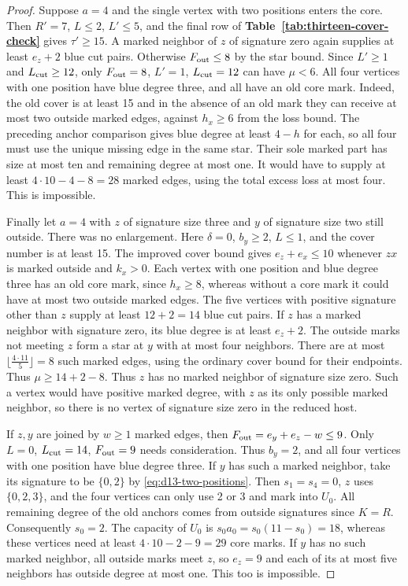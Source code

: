 \documentclass[preprint,11pt,numbers]{elsarticle-arxiv}
\numberwithin{equation}{section}
\theoremstyle{definition}
\begin{document}
\begin{proof}
Suppose $a=4$ and the single vertex with two positions enters the
core. Then $R'=7$, $L\le2$, $L'\le5$, and the final row of
\textbf{Table~\ref{tab:thirteen-cover-check}} gives $\tau'\ge15$. A marked neighbor of $z$ of signature
zero again supplies at least $e_z+2$ blue cut pairs. Otherwise
$F_{\rm out}\le8$ by the star bound. Since $L'\ge1$ and
$L_{\rm cut}\ge12$, only $F_{\rm out}=8$, $L'=1$, $L_{\rm cut}=12$
can have $\mu<6$. All four vertices with one position have blue
degree three, and all have an old core mark. Indeed, the old cover
is at least 15 and in the absence of an old mark they can receive
at most two outside marked edges, against $h_x\ge6$ from the loss bound.
The preceding anchor comparison gives blue degree at least $4-h$
for each, so all four must use the unique missing edge in the same
star. Their sole marked part has size at most ten and remaining degree
at most one. It would have to supply at least $4\cdot10-4-8=28$
marked edges, using the total excess loss at most four. This is
impossible.

Finally let $a=4$ with $z$ of signature size three and $y$ of
signature size two still outside. There was no enlargement. Here
$\delta=0$, $b_y\ge2$, $L\le1$, and the cover number is at least
15. The improved cover bound gives $e_z+e_x\le10$ whenever $zx$
is marked outside and $k_x>0$. Each vertex with one position and
blue degree three has an old core mark, since $h_x\ge8$, whereas
without a core mark it could have at most two outside marked edges.
The five vertices with positive signature other than $z$ supply
at least $12+2=14$ blue cut pairs. If $z$ has a marked neighbor with
signature zero, its blue degree is at least $e_z+2$. The outside
marks not meeting $z$ form a star at $y$ with at most four neighbors.
There are at most $\lfloor\frac{4\cdot11}{5}\rfloor=8$ such marked edges, using
the ordinary cover bound for their endpoints. Thus $\mu\ge14+2-8$.
Thus $z$ has no marked neighbor of signature size zero. Such
a vertex would have positive marked degree, with $z$ as its only
possible marked neighbor, so there is no vertex of signature size
zero in the reduced host.

If $z,y$ are joined by $w\ge1$ marked edges, then
$F_{\rm out}=e_y+e_z-w\le9$. Only $L=0$, $L_{\rm cut}=14$,
$F_{\rm out}=9$ needs consideration. Thus $b_y=2$, and all four
vertices with one position have blue degree three. If $y$ has such a
marked neighbor, take its signature to be $\{0,2\}$ by
\eqref{eq:d13-two-positions}. Then $s_1=s_4=0$, $z$ uses $\{0,2,3\}$,
and the four vertices can only use 2 or 3 and mark into $U_0$.
All remaining degree of the old anchors comes from outside signatures
since $K=R$. Consequently $s_0=2$. The capacity of $U_0$ is
$s_0a_0=s_0(11-s_0)=18$, whereas these vertices need at least
$4\cdot10-2-9=29$ core marks. If $y$ has no such marked neighbor,
all outside marks meet $z$, so $e_z=9$ and each of its at most five
neighbors has outside degree at most one. This too is impossible.


\end{proof}
\end{document}
